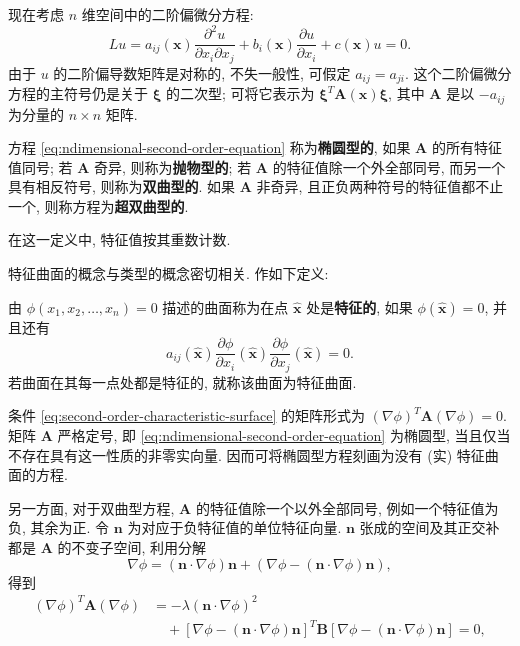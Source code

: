 现在考虑 $n$ 维空间中的二阶偏微分方程:
\begin{equation}\label{eq:ndimensional-second-order-equation}
Lu=a_{ij}(\bm{x})\dfrac{\partial^2u}{\partial x_i\partial x_j}+b_i(\bm{x})\dfrac{\partial u}{\partial x_i}+c(\bm{x})u=0.
\end{equation}
由于 $u$ 的二阶偏导数矩阵是对称的, 不失一般性, 可假定 $a_{ij}=a_{ji}$. 这个二阶偏微分方程的主符号仍是关于 $\bm{\xi}$ 的二次型; 可将它表示为 $\bm{\xi}^T\bm{A}(\bm{x})\bm{\xi}$, 其中 $\bm{A}$ 是以 $-a_{ij}$ 为分量的 $n\times n$ 矩阵.

\begin{Definition}
\label{def:ndimensional-second-order-type}
方程 \eqref{eq:ndimensional-second-order-equation} 称为\textbf{椭圆型的}, 如果 $\bm{A}$ 的所有特征值同号; 若 $\bm{A}$ 奇异, 则称为\textbf{抛物型的}; 若 $\bm{A}$ 的特征值除一个外全部同号, 而另一个具有相反符号, 则称为\textbf{双曲型的}. 如果 $\bm{A}$ 非奇异, 且正负两种符号的特征值都不止一个, 则称方程为\textbf{超双曲型的}.
\end{Definition}

在这一定义中, 特征值按其重数计数.

特征曲面的概念与类型的概念密切相关. 作如下定义:

\begin{Definition}
\label{def:second-order-characteristic-surface}
由 $\phi(x_1,x_2,\ldots,x_n)=0$ 描述的曲面称为在点 $\hat{\bm{x}}$ 处是\textbf{特征的}, 如果 $\phi(\hat{\bm{x}})=0$, 并且还有
\begin{equation}\label{eq:second-order-characteristic-surface}
a_{ij}(\hat{\bm{x}})\dfrac{\partial\phi}{\partial x_i}(\hat{\bm{x}})\dfrac{\partial\phi}{\partial x_j}(\hat{\bm{x}})=0.
\end{equation}
若曲面在其每一点处都是特征的, 就称该曲面为特征曲面.
\end{Definition}

条件 \eqref{eq:second-order-characteristic-surface} 的矩阵形式为 $(\nabla\phi)^T\bm{A}(\nabla\phi)=0$. 矩阵 $\bm{A}$ 严格定号, 即 \eqref{eq:ndimensional-second-order-equation} 为椭圆型, 当且仅当不存在具有这一性质的非零实向量. 因而可将椭圆型方程刻画为没有 (实) 特征曲面的方程.

另一方面, 对于双曲型方程, $\bm{A}$ 的特征值除一个以外全部同号, 例如一个特征值为负, 其余为正. 令 $\bm{n}$ 为对应于负特征值的单位特征向量. $\bm{n}$ 张成的空间及其正交补都是 $\bm{A}$ 的不变子空间, 利用分解
\begin{equation}\label{eq:characteristic-gradient-decomposition}
\nabla\phi=(\bm{n}\cdot\nabla\phi)\bm{n}+(\nabla\phi-(\bm{n}\cdot\nabla\phi)\bm{n}),
\end{equation}
得到
\begin{equation}\label{eq:hyperbolic-characteristic-cone}
\begin{aligned}
(\nabla\phi)^T\bm{A}(\nabla\phi)
&=-\lambda(\bm{n}\cdot\nabla\phi)^2\\
&\quad+[\nabla\phi-(\bm{n}\cdot\nabla\phi)\bm{n}]^T
\bm{B}[\nabla\phi-(\bm{n}\cdot\nabla\phi)\bm{n}]=0,
\end{aligned}
\end{equation}



